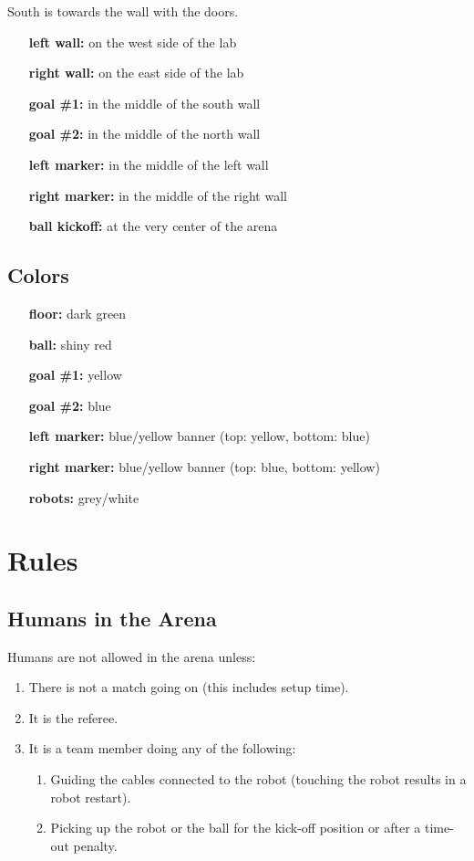 \documentclass[a4paper, 12pt, oneside]{article}
\begin{document}
South is towards the wall with the doors.

\begin{enumerate}
    \item[\textbf{left wall:}] on the west side of the lab
    \item[\textbf{right wall:}] on the east side of the lab
    \item[\textbf{goal \#1:}] in the middle of the south wall
    \item[\textbf{goal \#2:}] in the middle of the north wall
    \item[\textbf{left marker:}] in the middle of the left wall
    \item[\textbf{right marker:}] in the middle of the right wall
    \item[\textbf{ball kickoff:}] at the very center of the arena
\end{enumerate}

\subsection{Colors}

\begin{enumerate}
    \item[\textbf{floor:}] dark green
    \item[\textbf{ball:}] shiny red
    \item[\textbf{goal \#1:}] yellow
    \item[\textbf{goal \#2:}] blue
    \item[\textbf{left marker:}] blue/yellow banner (top: yellow, bottom: blue)
    \item[\textbf{right marker:}] blue/yellow banner (top: blue, bottom: yellow)
    \item[\textbf{robots:}] grey/white
\end{enumerate}

\section{Rules}

\subsection{Humans in the Arena}

Humans are not allowed in the arena unless:
\begin{enumerate}
    \item There is not a match going on (this includes setup time).
    \item It is the referee.
    \item It is a team member doing any of the following:
    \begin{enumerate}
        \item Guiding the cables connected to the robot (touching the robot results in a robot restart).
        \item Picking up the robot or the ball for the kick-off position or after a time-out penalty.
    \end{enumerate}
\end{enumerate}
\end{document}
